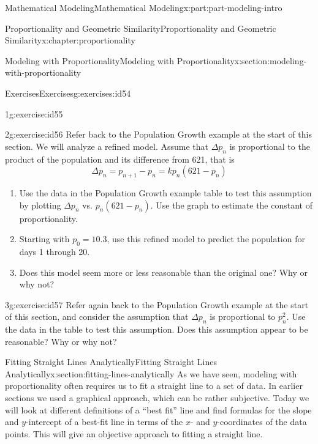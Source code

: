 \documentclass[oneside,10pt,]{book}
\numberwithin{equation}{section}
\begin{document}
\begin{partptx}{Mathematical Modeling}{}{Mathematical Modeling}{}{}{x:part:part-modeling-intro}
\begin{chapterptx}{Proportionality and Geometric Similarity}{}{Proportionality and Geometric Similarity}{}{}{x:chapter:proportionality}
\begin{sectionptx}{Modeling with Proportionality}{}{Modeling with Proportionality}{}{}{x:section:modeling-with-proportionality}
\begin{exercises-subsection-numberless}{Exercises}{}{Exercises}{}{}{g:exercises:id54}
\begin{divisionexercise}{1}{}{}{g:exercise:id55}
\begin{enumerate}[font=\bfseries,label=(\alph*),ref=\alph*]
\end{enumerate}
\end{divisionexercise}%
\begin{divisionexercise}{2}{}{}{g:exercise:id56}%
Refer back to the Population Growth example at the start of this section. We will analyze a refined model. Assume that \(\Delta p_n\) is proportional to the product of the population and its difference from 621, that is%
%
\begin{equation*}
\Delta p_n = p_{n+1}-p_n = kp_n(621-p_n)
\end{equation*}
\begin{enumerate}[font=\bfseries,label=(\alph*),ref=\alph*]
\item{}Use the data in the Population Growth example table to test this assumption by plotting \(\Delta p_n\) vs. \(p_n(621 - p_n)\). Use the graph to estimate the constant of proportionality.%
\item{}Starting with \(p_0 = 10.3\), use this refined model to predict the population for days 1 through 20.%
\item{}Does this model seem more or less reasonable than the original one? Why or why not?%
\end{enumerate}
\end{divisionexercise}%
\begin{divisionexercise}{3}{}{}{g:exercise:id57}%
Refer again back to the Population Growth example at the start of this section, and consider the assumption that \(\Delta p_n\) is proportional to \(p_n^2\). Use the data in the table to test this assumption. Does this assumption appear to be reasonable? Why or why not?%
\end{divisionexercise}%
\end{exercises-subsection-numberless}
\end{sectionptx}
%
%
\typeout{************************************************}
\typeout{************************************************}
%
\begin{sectionptx}{Fitting Straight Lines Analytically}{}{Fitting Straight Lines Analytically}{}{}{x:section:fitting-lines-analytically}
As we have seen, modeling with proportionality often requires us to fit a straight line to a set of data. In earlier sections we used a graphical approach, which can be rather subjective. Today we will look at different definitions of a ``best fit'' line and find formulas for the slope and \(y\)-intercept of a best-fit line in terms of the \(x\)- and \(y\)-coordinates of the data points. This will give an objective approach to fitting a straight line.%

\end{sectionptx}
\end{chapterptx}
\end{partptx}
\end{document}
